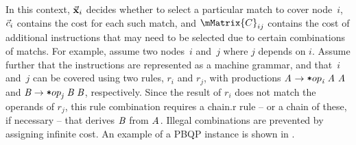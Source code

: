 In this context, $\mVector{\mVar{x}}_i$ decides whether to select a particular
\gls{match} to cover \gls{node}~$i$, $\vec{c}_i$ contains the cost for each
such \gls{match}, and $\mMatrix{C}_{ij}$ contains the cost of additional
\glspl{instruction} that may need to be selected due to certain combinations of
\glspl{match}.
%
For example, assume two nodes~$i$ and~$j$ where $j$ depends on $i$.
%
Assume further that the \glspl{instruction} are represented as a
 \gls{machine grammar}, and that~$i$ and~$j$ can be
covered using two \glspl{rule}, $r_i$ and $r_j$, with \glspl{production}
\mbox{$\mNT{A} \rightarrow \irCode*{op}_{\mathit{i}} \; \mNT{A} \; \mNT{A}$} and
\mbox{$\mNT{B} \rightarrow \irCode*{op}_{\mathit{j}} \; \mNT{B} \; \mNT{B}$},
respectively.
%
Since the result of $r_i$ does not match the operands of $r_j$, this \gls{rule}
combination requires a \gls{chain.r} \gls{rule} -- or a chain of these, if
necessary -- that derives $\mNT{B}$ from $\mNT{A}$.
%
Illegal combinations are prevented by assigning infinite cost.
%
An example of a \gls{PBQP} instance is shown in .

